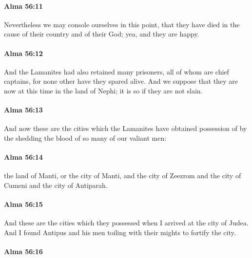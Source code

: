 		\paragraph{Alma 56:11} %
			\label{ALMA-56-11}

			Nevertheless we may console ourselves in this point,
			that they have died in the cause of their country and of their God;
			yea, and they are happy.

		\paragraph{Alma 56:12} %
			\label{ALMA-56-12}

			And the Lamanites had also retained many prisoners,
			all of whom are chief captains,
			for none other have they spared alive.
			And we suppose that they are now at this time in the land of Nephi;
			it is so if they are not slain.

		\paragraph{Alma 56:13} %
			\label{ALMA-56-13}

			And now these are the cities
			which the Lamanites have obtained possession of
			by the shedding the blood of so many of our valiant men:

		\paragraph{Alma 56:14} %
			\label{ALMA-56-14}

			the land of Manti, or the city of Manti,
			and the city of Zeezrom and the city of Cumeni and the city of Antiparah.

		\paragraph{Alma 56:15} %
			\label{ALMA-56-15}

			And these are the cities which they possessed when I arrived at the city of Judea.
			And I found Antipus and his men toiling with their mights to fortify the city.

		\paragraph{Alma 56:16} %
			\label{ALMA-56-16}

